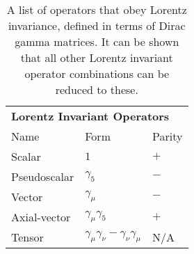 %
%
%
\begin{table}[h!!!!t]
	\begin{center}
	\begin{tabular}{ l  l  l}
		\multicolumn{3}{l}{ \textbf{Lorentz Invariant Operators}}
		\\  %
		\multicolumn{1}{l}{Name} 		& \multicolumn{1}{l}{ Form}   								& \multicolumn{1}{l}{Parity}   	
		\\  \hline
		Scalar 			   				& $1$														& $+$									
		\\
		Pseudoscalar \;\;\;\;\;\;\;		& $\gamma_5$									 			& $-$				
		\\
		Vector							& $\gamma_\mu$												& $-$				
		\\
		Axial-vector					& $\gamma_\mu \gamma_5$										& $+$
		\\
		Tensor							& $\gamma_\mu \gamma_\nu - \gamma_\nu \gamma_\mu$ \;\;		& N/A									
		\\  \hline
	\end{tabular}
	\end{center}
	\caption[Lorentz Invariant Operators]{A list of operators that obey Lorentz invariance, defined in terms of Dirac gamma matrices.  It can be shown that all other Lorentz invariant operator combinations can be reduced to these.}
	\label{table:dirac_matrix_operators}
\end{table}

